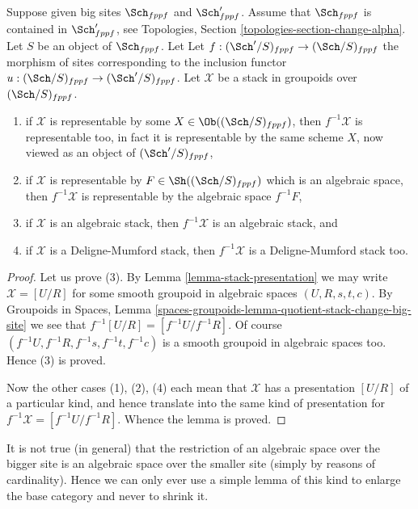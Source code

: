 \begin{lemma}
\label{lemma-change-big-site}
Suppose given big sites $\Sch_{fppf}$ and $\Sch'_{fppf}$.
Assume that $\Sch_{fppf}$ is contained in $\Sch'_{fppf}$,
see Topologies, Section \ref{topologies-section-change-alpha}.
Let $S$ be an object of $\Sch_{fppf}$. Let
Let $f : (\Sch'/S)_{fppf} \to (\Sch/S)_{fppf}$ the morphism
of sites corresponding to the inclusion functor
$u : (\Sch/S)_{fppf} \to (\Sch'/S)_{fppf}$.
Let $\mathcal{X}$ be a stack in groupoids over $(\Sch/S)_{fppf}$.
\begin{enumerate}
\item if $\mathcal{X}$ is representable by some
$X \in \Ob((\Sch/S)_{fppf})$, then
$f^{-1}\mathcal{X}$ is representable too, in fact it is representable by the
same scheme $X$, now viewed as an object of $(\Sch'/S)_{fppf}$,
\item if $\mathcal{X}$ is representable by
$F \in \Sh((\Sch/S)_{fppf})$ which is
an algebraic space, then $f^{-1}\mathcal{X}$ is representable
by the algebraic space $f^{-1}F$,
\item if $\mathcal{X}$ is an algebraic stack, then $f^{-1}\mathcal{X}$
is an algebraic stack, and
\item if $\mathcal{X}$ is a Deligne-Mumford stack, then $f^{-1}\mathcal{X}$
is a Deligne-Mumford stack too.
\end{enumerate}
\end{lemma}

\begin{proof}
Let us prove (3). By
Lemma \ref{lemma-stack-presentation}
we may write $\mathcal{X} = [U/R]$ for some smooth
groupoid in algebraic spaces $(U, R, s, t, c)$. By
Groupoids in Spaces,
Lemma \ref{spaces-groupoids-lemma-quotient-stack-change-big-site}
we see that $f^{-1}[U/R] = [f^{-1}U/f^{-1}R]$.
Of course $(f^{-1}U, f^{-1}R, f^{-1}s, f^{-1}t, f^{-1}c)$
is a smooth groupoid in algebraic spaces too. Hence (3) is proved.

\medskip\noindent
Now the other cases (1), (2), (4) each mean that $\mathcal{X}$ has
a presentation $[U/R]$ of a particular kind, and hence translate into the
same kind of presentation for $f^{-1}\mathcal{X} = [f^{-1}U/f^{-1}R]$.
Whence the lemma is proved.
\end{proof}

\noindent
It is not true (in general) that the restriction of an algebraic space
over the bigger site is an algebraic space over the smaller site (simply
by reasons of cardinality). Hence we can only ever use a simple lemma of this
kind to enlarge the base category and never to shrink it.

